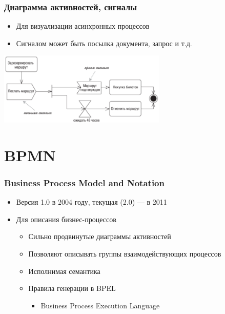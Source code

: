 \documentclass{../../slides-style}
\begin{document}
    \begin{frame}
        \frametitle{Диаграмма активностей, сигналы}
        \begin{itemize}
            \item Для визуализации асинхронных процессов
            \item Сигналом может быть посылка документа, запрос и т.д.
        \end{itemize}
        \begin{center}
            \includegraphics[width=0.6\textwidth]{activitySignals.png}
        \end{center}
    \end{frame}

    \section{BPMN}

    \begin{frame}
        \frametitle{Business Process Model and Notation}
        \begin{itemize}
            \item Версия 1.0 в 2004 году, текущая (2.0) --- в 2011
            \item Для описания бизнес-процессов
            \begin{itemize}
                \item Сильно продвинутые диаграммы активностей
                \item Позволяют описывать группы взаимодействующих процессов
                \item Исполнимая семантика
                \item Правила генерации в BPEL
                \begin{itemize}
                    \item Business Process Execution Language
                \end{itemize}
            \end{itemize}
        \end{itemize}
    \end{frame}
\end{document}
